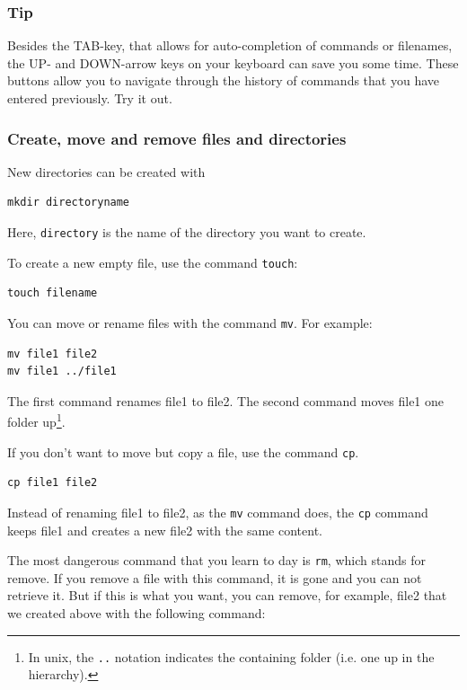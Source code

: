 \documentclass[11pt]{article}
\begin{document}
\subsubsection{Tip}
\label{sec-2-1-6}

Besides the TAB-key, that allows for auto-completion of commands or
filenames, the UP- and DOWN-arrow keys on your keyboard can save you
some time. These buttons allow you to navigate through the history of
commands that you have entered previously.  Try it out.
\subsubsection{Create, move and remove files and directories}
\label{sec-2-1-7}

New directories can be created with


\begin{verbatim}
mkdir directoryname
\end{verbatim}
Here, \texttt{directory} is the name of the directory you want to create.

To create a new empty file, use the command \texttt{touch}:


\begin{verbatim}
touch filename
\end{verbatim}

You can move or rename files with the command \texttt{mv}. For example:


\begin{verbatim}
mv file1 file2
mv file1 ../file1
\end{verbatim}

The first command renames file1 to file2. The second command moves
file1 one folder up\footnote{In unix, the \texttt{..} notation indicates the containing folder (i.e. one
up in the hierarchy).
 }.

If you don't want to move but copy a file, use the command \texttt{cp}.


\begin{verbatim}
cp file1 file2
\end{verbatim}
Instead of renaming file1 to file2, as the \texttt{mv} command does, the \texttt{cp}
command keeps file1 and creates a new file2 with the same content.

The most dangerous command that you learn to day is \texttt{rm}, which stands
for remove. If you remove a file with this command, it is gone and you
can not retrieve it. But if this is what you want, you can remove, for
example, file2 that we created above with the following command:
\end{document}
